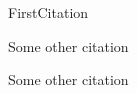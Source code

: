 %
%

\begin{thebibliography}{99}
\setlength{\itemsep}{-1.5mm}

	FirstCitation
	
	Some other citation	
	
	Some other citation

\end{thebibliography}
